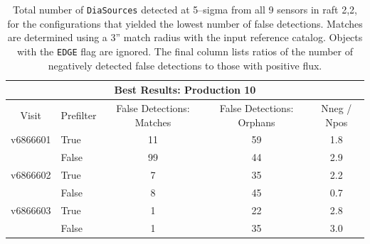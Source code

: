 \documentclass[prd, nofootinbib, floatfix, 11pt,tightenlines,times]{article}
\begin{document}
\begin{table}
\centering
\begin{tabular}{clccc}
\hline
\multicolumn{5}{|c|}{Best Results: Production 10} \\
\hline
Visit    & Prefilter & False Detections: Matches & False Detections: Orphans & Nneg / Npos \\
\hline
v6866601 & True      & 11                        & 59  & 1.8 \\ 
         & False     & 99                        & 44  & 2.9 \\
v6866602 & True      & 7                         & 35  & 2.2 \\
         & False     & 8                         & 45  & 0.7 \\
v6866603 & True      & 1                         & 22  & 2.8 \\
         & False     & 1                         & 35  & 3.0 \\
\end{tabular}
\caption{Total number of {\tt DiaSources} detected at 5--sigma from
  all 9 sensors in raft 2,2, for the configurations that yielded the
  lowest number of false detections.  Matches are determined using a
  3'' match radius with the input reference catalog.  Objects with the
  {\tt EDGE} flag are ignored.  The final column lists ratios of the
  number of negatively detected false detections to those with
  positive flux. \label{tab-bestfp10b}}
\end{table}
\end{document}
